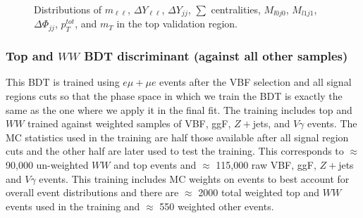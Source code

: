 \begin{figure}[!h]
{  }\hfill
  \hfill
  \hfill
{\caption{Distributions of $m_{\ell\ell}$, $\Delta Y_{\ell\ell}$, $\Delta Y_{jj}$, $\sum$ centralities, $M_{l0j0}$, $M_{l1j1}$, $\Delta\Phi_{jj}$, $p_T^{tot}$, and $m_T$ in the top validation region.
\label{fig:TopCR3}}}
\end{figure}

\subsubsection{Top and $WW$ BDT discriminant (against all other samples)}

This BDT is trained using $e\mu+\mu e$ events after the VBF selection and all signal regions cuts so that the phase space in which we train the BDT is exactly the same as the one where we apply it in the final fit. The training includes top and $WW$ trained against weighted samples of VBF, ggF, $Z+$jets, and $V\gamma$ events. The MC statistics used in the training are half those available after all signal region cuts and the other half are later used to test the training. This corresponds to $\approx$ 90,000 un-weighted $WW$ and top events and $\approx$ 115,000 raw VBF, ggF, $Z+$jets and $V\gamma$ events. This training includes MC weights on events to best account for overall event distributions and there are $\approx$ 2000 total weighted top and $WW$ events used in the training and $\approx$ 550 weighted other events. 

